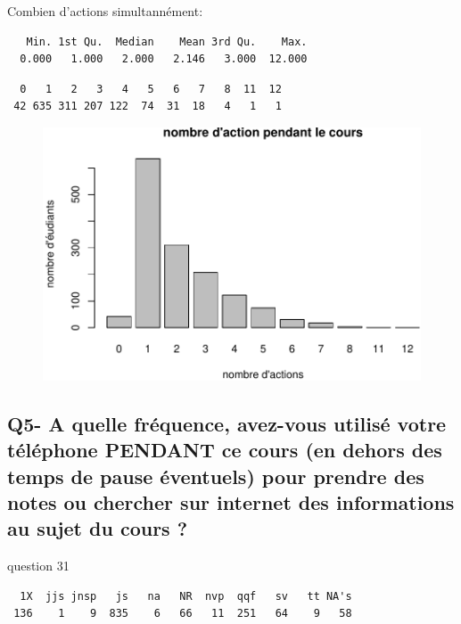 \documentclass[]{article}
\begin{document}
Combien d'actions simultannément:

\begin{verbatim}
   Min. 1st Qu.  Median    Mean 3rd Qu.    Max. 
  0.000   1.000   2.000   2.146   3.000  12.000 
\end{verbatim}

\begin{verbatim}
  0   1   2   3   4   5   6   7   8  11  12 
 42 635 311 207 122  74  31  18   4   1   1 
\end{verbatim}

\begin{figure}[htbp]
\centering
\includegraphics{qs_etudiants_files/figure-latex/actions_sim-1.pdf}
\end{figure}

\subsection{Q5- A quelle fréquence, avez-vous utilisé votre téléphone
PENDANT ce cours (en dehors des temps de pause éventuels) pour prendre
des notes ou chercher sur internet des informations au sujet du cours
?}\label{q5--a-quelle-frequence-avez-vous-utilise-votre-telephone-pendant-ce-cours-en-dehors-des-temps-de-pause-eventuels-pour-prendre-des-notes-ou-chercher-sur-internet-des-informations-au-sujet-du-cours}

question 31

\begin{verbatim}
  1X  jjs jnsp   js   na   NR  nvp  qqf   sv   tt NA's 
 136    1    9  835    6   66   11  251   64    9   58 
\end{verbatim}
\end{document}
